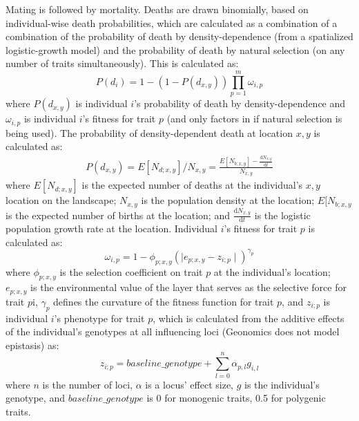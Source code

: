 ﻿\documentclass{article}
\begin{document}
Mating is followed by mortality. Deaths are drawn binomially, based on 
individual-wise death probabilities, which are calculated as a combination of
a combination of the probability of death by density-dependence (from a spatialized logistic-growth model)
and the probability of death by natural selection (on any number of traits simultaneously). 
This is calculated as:
\begin{equation}
P(d_{i}) = 1 - (1 - P(d_{x,y})) \prod_{p = 1}^{m}\omega_{i,p}
\end{equation}
where $P(d_{x,y})$ is individual $i$'s probability of death by density-dependence
and $\omega_{i,p}$ is individual $i$'s fitness for trait $p$
(and only factors in if natural selection is being used).
The probability of density-dependent death at location $x,y$ is calculated as:
\begin{equation}
\begin{split}
       P(d_{x,y}) = E[N_{d;x,y}]/N_{x,y} = \frac{E[N_{b;x,y}] - \frac{\mathrm{d}N_{x,y}}{\mathrm{d}t}}{N_{x,y}}
\end{split}
\end{equation}
where $E[N_{d;x,y}]$ is the expected number of deaths at the individual's $x,y$ location on the landscape;
$N_{x,y}$ is the population density at the location;
$E[N_{b;x,y}$ is the expected number of births at the location;
and $\frac{\mathrm{d}N_{x,y}}{\mathrm{d}t}$ is the logistic population growth rate at the location.
Individual $i$'s fitness for trait $p$ is calculated as:
\begin{equation}
\omega_{i,p}= 1 - \phi_{p;x,y} (\mid e_{p;x,y} - z_{i;p} \mid)^{\gamma_{p}}
\end{equation}
where $\phi_{p;x,y}$ is the selection coefficient on trait $p$ at the
individual's location; $e_{p;x,y}$ is the environmental value
of the layer that serves as the selective force for trait $p$i,
$\gamma_{p}$ defines the curvature of the fitness function for trait $p$,
and $z_{i;p}$ is individual $i$'s phenotype for trait $p$, which is calculated
from the additive effects of the individual's genotypes at all influencing loci
(Geonomics does not model epistasis) as:
\begin{equation}
z_{i;p} = baseline\_genotype + \sum_{l = 0}^{n} \alpha_{p,l} g_{i,l}
\end{equation}
where $n$ is the number of loci, $\alpha$ is a locus' effect size, $g$ is the
individual's genotype, and $baseline\_genotype$ is 0 for monogenic traits,
0.5 for polygenic traits. 
\end{document}
